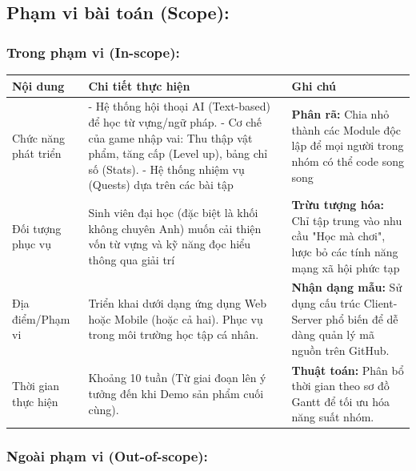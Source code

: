 \subsection{Phạm vi bài toán (Scope):}
\subsubsection{Trong phạm vi (In-scope):}

\begin{table}[H]
\centering
\renewcommand{\arraystretch}{1.5}
\begin{tabularx}{\textwidth}{|>{\raggedright\arraybackslash}p{3.5cm}|X|>{\raggedright\arraybackslash}p{4cm}|}
\hline
\textbf{Nội dung} & \textbf{Chi tiết thực hiện} & \textbf{Ghi chú} \\ \hline
Chức năng phát triển & - Hệ thống hội thoại AI (Text-based) để học từ vựng/ngữ pháp. \newline - Cơ chế của game nhập vai: Thu thập vật phẩm, tăng cấp (Level up), bảng chỉ số (Stats). \newline - Hệ thống nhiệm vụ (Quests) dựa trên các bài tập & \textbf{Phân rã:} Chia nhỏ thành các Module độc lập để mọi người trong nhóm có thể code song song \\ \hline
Đối tượng phục vụ & Sinh viên đại học (đặc biệt là khối không chuyên Anh) muốn cải thiện vốn từ vựng và kỹ năng đọc hiểu thông qua giải trí & \textbf{Trừu tượng hóa:} Chỉ tập trung vào nhu cầu "Học mà chơi", lược bỏ các tính năng mạng xã hội phức tạp \\ \hline
Địa điểm/Phạm vi & Triển khai dưới dạng ứng dụng Web hoặc Mobile (hoặc cả hai). Phục vụ trong môi trường học tập cá nhân. & \textbf{Nhận dạng mẫu:} Sử dụng cấu trúc Client-Server phổ biến để dễ dàng quản lý mã nguồn trên GitHub. \\ \hline
Thời gian thực hiện & Khoảng 10 tuần (Từ giai đoạn lên ý tưởng đến khi Demo sản phẩm cuối cùng). & \textbf{Thuật toán:} Phân bổ thời gian theo sơ đồ Gantt để tối ưu hóa năng suất nhóm. \\ \hline
\end{tabularx}
\end{table}

\subsubsection{Ngoài phạm vi (Out-of-scope):}

